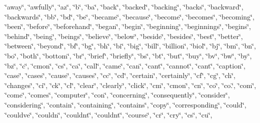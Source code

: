 \char`\"{}away\char`\"{}, \char`\"{}awfully\char`\"{}, \char`\"{}az\char`\"{}, \char`\"{}b\char`\"{}, \char`\"{}ba\char`\"{}, \char`\"{}back\char`\"{}, \char`\"{}backed\char`\"{}, \char`\"{}backing\char`\"{}, \char`\"{}backs\char`\"{}, \char`\"{}backward\char`\"{}, \char`\"{}backwards\char`\"{}, \char`\"{}bb\char`\"{}, \char`\"{}bd\char`\"{}, \char`\"{}be\char`\"{}, \char`\"{}became\char`\"{}, \char`\"{}because\char`\"{}, \char`\"{}become\char`\"{}, \char`\"{}becomes\char`\"{}, \char`\"{}becoming\char`\"{}, \char`\"{}been\char`\"{}, \char`\"{}before\char`\"{}, \char`\"{}beforehand\char`\"{}, \char`\"{}began\char`\"{}, \char`\"{}begin\char`\"{}, \char`\"{}beginning\char`\"{}, \char`\"{}beginnings\char`\"{}, \char`\"{}begins\char`\"{}, \char`\"{}behind\char`\"{}, \char`\"{}being\char`\"{}, \char`\"{}beings\char`\"{}, \char`\"{}believe\char`\"{}, \char`\"{}below\char`\"{}, \char`\"{}beside\char`\"{}, \char`\"{}besides\char`\"{}, \char`\"{}best\char`\"{}, \char`\"{}better\char`\"{}, \char`\"{}between\char`\"{}, \char`\"{}beyond\char`\"{}, \char`\"{}bf\char`\"{}, \char`\"{}bg\char`\"{}, \char`\"{}bh\char`\"{}, \char`\"{}bi\char`\"{}, \char`\"{}big\char`\"{}, \char`\"{}bill\char`\"{}, \char`\"{}billion\char`\"{}, \char`\"{}biol\char`\"{}, \char`\"{}bj\char`\"{}, \char`\"{}bm\char`\"{}, \char`\"{}bn\char`\"{}, \char`\"{}bo\char`\"{}, \char`\"{}both\char`\"{}, \char`\"{}bottom\char`\"{}, \char`\"{}br\char`\"{}, \char`\"{}brief\char`\"{}, \char`\"{}briefly\char`\"{}, \char`\"{}bs\char`\"{}, \char`\"{}bt\char`\"{}, \char`\"{}but\char`\"{}, \char`\"{}buy\char`\"{}, \char`\"{}bv\char`\"{}, \char`\"{}bw\char`\"{}, \char`\"{}by\char`\"{}, \char`\"{}bz\char`\"{}, \char`\"{}c\char`\"{}, \char`\"{}c\textquotesingle{}mon\char`\"{}, \char`\"{}c\textquotesingle{}s\char`\"{}, \char`\"{}ca\char`\"{}, \char`\"{}call\char`\"{}, \char`\"{}came\char`\"{}, \char`\"{}can\char`\"{}, \char`\"{}can\textquotesingle{}t\char`\"{}, \char`\"{}cannot\char`\"{}, \char`\"{}cant\char`\"{}, \char`\"{}caption\char`\"{}, \char`\"{}case\char`\"{}, \char`\"{}cases\char`\"{}, \char`\"{}cause\char`\"{}, \char`\"{}causes\char`\"{}, \char`\"{}cc\char`\"{}, \char`\"{}cd\char`\"{}, \char`\"{}certain\char`\"{}, \char`\"{}certainly\char`\"{}, \char`\"{}cf\char`\"{}, \char`\"{}cg\char`\"{}, \char`\"{}ch\char`\"{}, \char`\"{}changes\char`\"{}, \char`\"{}ci\char`\"{}, \char`\"{}ck\char`\"{}, \char`\"{}cl\char`\"{}, \char`\"{}clear\char`\"{}, \char`\"{}clearly\char`\"{}, \char`\"{}click\char`\"{}, \char`\"{}cm\char`\"{}, \char`\"{}cmon\char`\"{}, \char`\"{}cn\char`\"{}, \char`\"{}co\char`\"{}, \char`\"{}co.\char`\"{}, \char`\"{}com\char`\"{}, \char`\"{}come\char`\"{}, \char`\"{}comes\char`\"{}, \char`\"{}computer\char`\"{}, \char`\"{}con\char`\"{}, \char`\"{}concerning\char`\"{}, \char`\"{}consequently\char`\"{}, \char`\"{}consider\char`\"{}, \char`\"{}considering\char`\"{}, \char`\"{}contain\char`\"{}, \char`\"{}containing\char`\"{}, \char`\"{}contains\char`\"{}, \char`\"{}copy\char`\"{}, \char`\"{}corresponding\char`\"{}, \char`\"{}could\char`\"{}, \char`\"{}could\textquotesingle{}ve\char`\"{}, \char`\"{}couldn\char`\"{}, \char`\"{}couldn\textquotesingle{}t\char`\"{}, \char`\"{}couldnt\char`\"{}, \char`\"{}course\char`\"{}, \char`\"{}cr\char`\"{}, \char`\"{}cry\char`\"{}, \char`\"{}cs\char`\"{}, \char`\"{}cu\char`\"{}, 